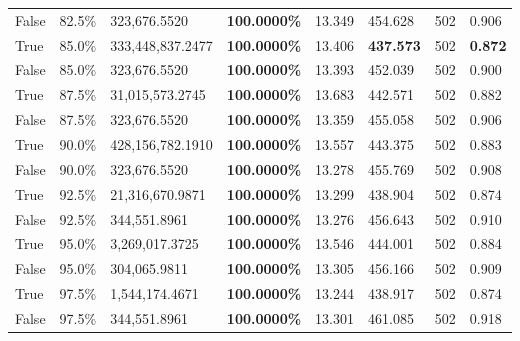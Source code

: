 \begin{table}[H]
\begin{tabular}{lllrllll}
\cline{1-8}
False & 82.5\% & 323,676.5520 & \bfseries \color{red} 100.0000\% & 13.349 & 454.628 & 502 & 0.906 \\
\cline{1-8}
True & 85.0\% & 333,448,837.2477 & \bfseries \color{red} 100.0000\% & 13.406 & \bfseries \color{red} 437.573 & 502 & \bfseries \color{red} 0.872 \\
\cline{1-8}
False & 85.0\% & 323,676.5520 & \bfseries \color{red} 100.0000\% & 13.393 & 452.039 & 502 & 0.900 \\
\cline{1-8}
True & 87.5\% & 31,015,573.2745 & \bfseries \color{red} 100.0000\% & 13.683 & 442.571 & 502 & 0.882 \\
\cline{1-8}
False & 87.5\% & 323,676.5520 & \bfseries \color{red} 100.0000\% & 13.359 & 455.058 & 502 & 0.906 \\
\cline{1-8}
True & 90.0\% & 428,156,782.1910 & \bfseries \color{red} 100.0000\% & 13.557 & 443.375 & 502 & 0.883 \\
\cline{1-8}
False & 90.0\% & 323,676.5520 & \bfseries \color{red} 100.0000\% & 13.278 & 455.769 & 502 & 0.908 \\
\cline{1-8}
True & 92.5\% & 21,316,670.9871 & \bfseries \color{red} 100.0000\% & 13.299 & 438.904 & 502 & 0.874 \\
\cline{1-8}
False & 92.5\% & 344,551.8961 & \bfseries \color{red} 100.0000\% & 13.276 & 456.643 & 502 & 0.910 \\
\cline{1-8}
True & 95.0\% & 3,269,017.3725 & \bfseries \color{red} 100.0000\% & 13.546 & 444.001 & 502 & 0.884 \\
\cline{1-8}
False & 95.0\% & 304,065.9811 & \bfseries \color{red} 100.0000\% & 13.305 & 456.166 & 502 & 0.909 \\
\cline{1-8}
True & 97.5\% & 1,544,174.4671 & \bfseries \color{red} 100.0000\% & 13.244 & 438.917 & 502 & 0.874 \\
\cline{1-8}
False & 97.5\% & 344,551.8961 & \bfseries \color{red} 100.0000\% & 13.301 & 461.085 & 502 & 0.918 \\
\cline{1-8}
\bottomrule
\end{tabular}
\end{table}
